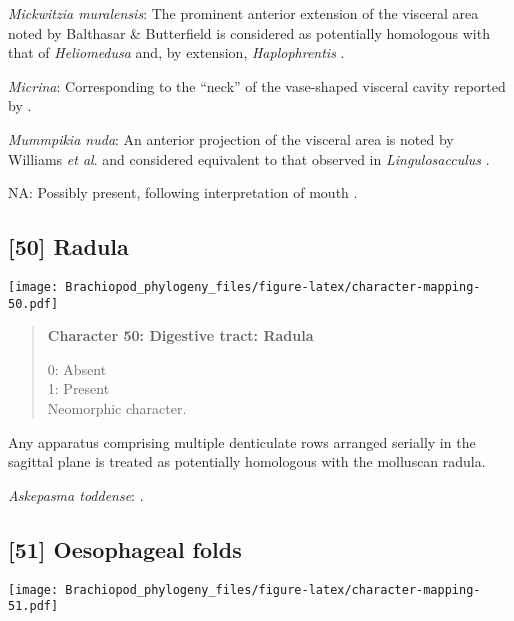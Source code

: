 \documentclass[openany]{book}
\theoremstyle{definition}
\theoremstyle{definition}
\theoremstyle{definition}
\theoremstyle{remark}
\begin{document}
\hypertarget{Mickwitzia_muralensis-coding-49}{}
\emph{Mickwitzia muralensis}: The prominent anterior extension of the
visceral area noted by Balthasar \& Butterfield
\citeyearpar{Balthasar2009EarlyCambrian} is considered as potentially
homologous with that of \emph{Heliomedusa}
\citep{Zhang2009Architectureand} and, by extension, \emph{Haplophrentis}
\citep{Moysiuk2017Hyolithsare}.

\hypertarget{Micrina-coding-49}{}
\emph{Micrina}: Corresponding to the ``neck'' of the vase-shaped
visceral cavity reported by \citet{Zhang2009Architectureand}.

\hypertarget{Mummpikia_nuda-coding-49}{}
\emph{Mummpikia nuda}: An anterior projection of the visceral area is
noted by Williams \emph{et al}.
\citeyearpar{Williams2000LinguliformeaCraniiformea} and considered
equivalent to that observed in \emph{Lingulosacculus}
\citep{Balthasar2009EarlyCambrian}.

\hypertarget{NA-coding-49}{}
NA: Possibly present, following interpretation of mouth \citep[see fig.
2c, d in][]{Zhang2014Anearly}.

\subsection*{{[}50{]} Radula}\label{radula}

\texttt{[image: Brachiopod\_phylogeny\_files/figure-latex/character-mapping-50.pdf]}

\begin{quote}
\textbf{Character 50: Digestive tract: Radula}

0: Absent\\
1: Present\\
Neomorphic character.
\end{quote}

Any apparatus comprising multiple denticulate rows arranged serially in
the sagittal plane is treated as potentially homologous with the
molluscan radula.

\hypertarget{Askepasma_toddense-coding-50}{}
\emph{Askepasma toddense}: \citet{Smith2012M}.

\subsection*{{[}51{]} Oesophageal folds}\label{oesophageal-folds}

\texttt{[image: Brachiopod\_phylogeny\_files/figure-latex/character-mapping-51.pdf]}
\end{document}
